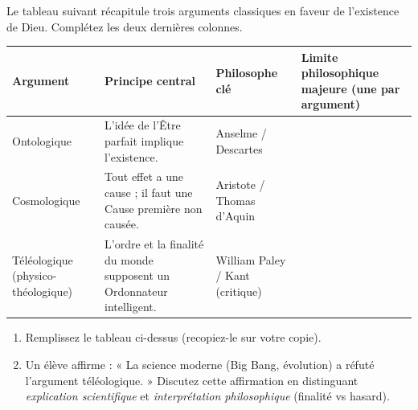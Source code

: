 \documentclass[11pt]{article}
\begin{document}
\begin{exercice}
Le tableau suivant récapitule trois arguments classiques en faveur de l'existence de Dieu. Complétez les deux dernières colonnes.

\begin{center}
\begin{tabularx}{\linewidth}{>{\hsize=1.2\hsize}X>{\hsize=1.5\hsize}X>{\hsize=1.5\hsize}X>{\hsize=1.8\hsize}X}
\toprule
\textbf{Argument} & \textbf{Principe central} & \textbf{Philosophe clé} & \textbf{Limite philosophique majeure (une par argument)} \\
\midrule
Ontologique & L'idée de l'Être parfait implique l'existence. & Anselme / Descartes &  \\
Cosmologique & Tout effet a une cause ; il faut une Cause première non causée. & Aristote / Thomas d'Aquin &  \\
Téléologique (physico-théologique) & L'ordre et la finalité du monde supposent un Ordonnateur intelligent. & William Paley / Kant (critique) &  \\
\bottomrule
\end{tabularx}
\end{center}

\begin{enumerate}
    \item Remplissez le tableau ci-dessus (recopiez-le sur votre copie).
    \item Un élève affirme : « La science moderne (Big Bang, évolution) a réfuté l'argument téléologique. » Discutez cette affirmation en distinguant \textit{explication scientifique} et \textit{interprétation philosophique} (finalité vs hasard).
\end{enumerate}
\end{exercice}
\end{document}
